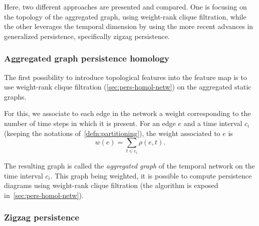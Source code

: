 \documentclass[a4paper,11pt,openany,extrafontsizes]{memoir}
\begin{document}
Here, two different approaches are presented and compared. One is
focusing on the topology of the aggregated graph, using weight-rank
clique filtration, while the other leverages the temporal dimension by
using the more recent advances in generalized persistence,
specifically zigzag persistence.

\subsubsection{Aggregated graph persistence homology}%
\label{sec:aggr-graph-pers}

The first possibility to introduce topological features into the
feature map is to use weight-rank clique filtration
(\autoref{sec:pers-homol-netw}) on the aggregated static graphs.

For this, we associate to each edge in the network a weight
corresponding to the number of time steps in which it is present. For
an edge $e$ and a time interval $c_i$ (keeping the notations
of~\autoref{defn:partitioning}), the weight associated to $e$ is
\[ w(e) = \sum_{t\in c_i} \rho(e,t). \]

The resulting graph is called the \emph{aggregated graph} of the
temporal network on the time interval $c_i$. This graph being
weighted, it is possible to compute persistence diagrams using
weight-rank clique filtration (the algorithm is exposed
in~\autoref{sec:pers-homol-netw}).




\subsubsection{Zigzag persistence}%
\label{sec:zigzag-persistence-1}
\end{document}
